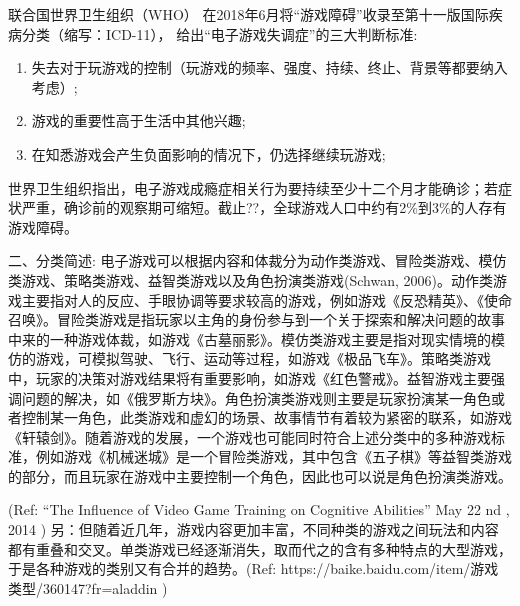 联合国世界卫生组织（WHO）%
在2018年6月将“游戏障碍”收录至第十一版国际疾病分类（缩写：ICD-11），
给出“电子游戏失调症”的三大判断标准:
\begin{enumerate}
\item 失去对于玩游戏的控制（玩游戏的频率、强度、持续、终止、背景等都要纳入考虑）;

\item 游戏的重要性高于生活中其他兴趣;

\item 在知悉游戏会产生负面影响的情况下，仍选择继续玩游戏;
 \end{enumerate}
 世界卫生组织指出，电子游戏成瘾症相关行为要持续至少十二个月才能确诊；若症状严重，确诊前的观察期可缩短。截止??，全球游戏人口中约有2\%到3\%的人存有游戏障碍。
 
二、分类简述:
  电子游戏可以根据内容和体裁分为动作类游戏、冒险类游戏、模仿类游戏、策略类游戏、益智类游戏以及角色扮演类游戏(Schwan, 2006)。动作类游戏主要指对人的反应、手眼协调等要求较高的游戏，例如游戏《反恐精英》、《使命召唤》。冒险类游戏是指玩家以主角的身份参与到一个关于探索和解决问题的故事中来的一种游戏体裁，如游戏《古墓丽影》。模仿类游戏主要是指对现实情境的模仿的游戏，可模拟驾驶、飞行、运动等过程，如游戏《极品飞车》。策略类游戏中，玩家的决策对游戏结果将有重要影响，如游戏《红色警戒》。益智游戏主要强调问题的解决，如《俄罗斯方块》。角色扮演类游戏则主要是玩家扮演某一角色或者控制某一角色，此类游戏和虚幻的场景、故事情节有着较为紧密的联系，如游戏《轩辕剑》。随着游戏的发展，一个游戏也可能同时符合上述分类中的多种游戏标准，例如游戏《机械迷城》是一个冒险类游戏，其中包含《五子棋》等益智类游戏的部分，而且玩家在游戏中主要控制一个角色，因此也可以说是角色扮演类游戏。
                         
         (Ref:      “The Influence of Video Game Training on Cognitive Abilities” May 22 nd , 2014 \cite{})
另：但随着近几年，游戏内容更加丰富，不同种类的游戏之间玩法和内容都有重叠和交叉。单类游戏已经逐渐消失，取而代之的含有多种特点的大型游戏，于是各种游戏的类别又有合并的趋势。(Ref: https://baike.baidu.com/item/游戏类型/360147?fr=aladdin \cite{})

